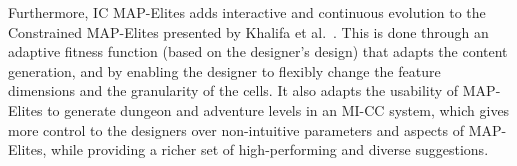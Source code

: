 Furthermore, IC MAP-Elites adds interactive and continuous evolution to the Constrained MAP-Elites presented by Khalifa et al.~. This is done through an adaptive fitness function (based on the designer's design) that adapts the content generation, and by enabling the designer to flexibly change the feature dimensions and the granularity of the cells. It also adapts the usability of MAP-Elites to generate dungeon and adventure levels in an MI-CC system, which gives more control to the designers over non-intuitive parameters and aspects of MAP-Elites, while providing a richer set of high-performing and diverse suggestions.





